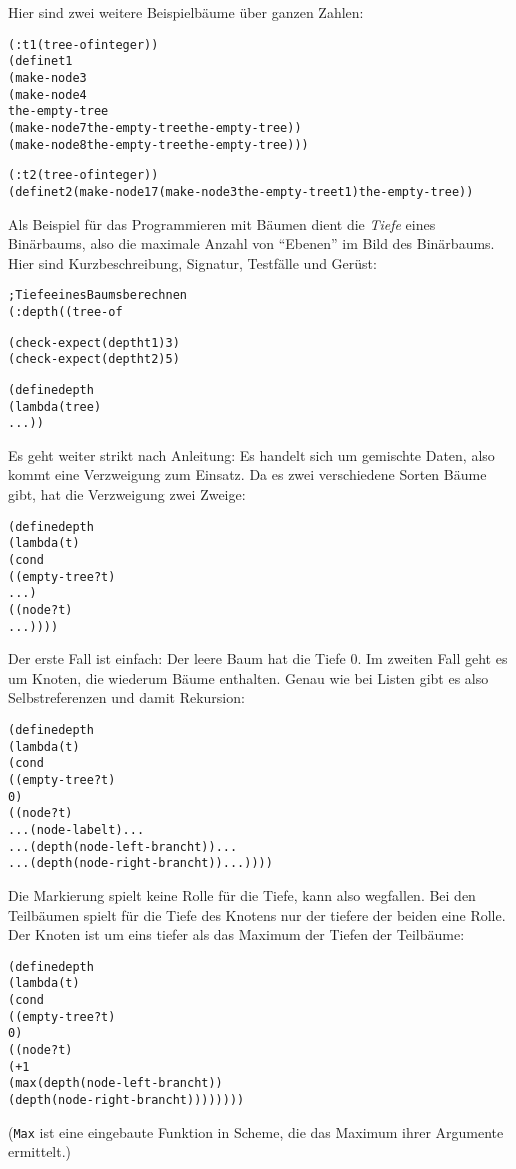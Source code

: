 %
Hier sind zwei weitere Beispielbäume über ganzen Zahlen:
\begin{alltt}
(: t1 (tree-of integer))
(define t1
  (make-node 3
    (make-node 4
      the-empty-tree
      (make-node 7 the-empty-tree the-empty-tree))
    (make-node 8 the-empty-tree the-empty-tree)))

(: t2 (tree-of integer))
(define t2 (make-node 17 (make-node 3 the-empty-tree t1) the-empty-tree))
\end{alltt}
Als Beispiel für das Programmieren mit Bäumen dient die
\textit{Tiefe}
eines Binärbaums, also die maximale Anzahl von "`Ebenen"' im Bild des
Binärbaums.  Hier sind Kurzbeschreibung, Signatur, Testfälle und
Gerüst:
%
\begin{alltt}
; Tiefe eines Baums berechnen
(: depth ((tree-of %a) -> natural))

(check-expect (depth t1) 3)
(check-expect (depth t2) 5)

(define depth
  (lambda (tree)
    ...))
\end{alltt}
%
Es geht weiter strikt nach Anleitung: Es handelt sich um gemischte
Daten, also kommt eine Verzweigung zum Einsatz.  Da es zwei
verschiedene Sorten Bäume gibt, hat die Verzweigung zwei Zweige:
%
\begin{alltt}
(define depth
  (lambda (t)
    (cond
      ((empty-tree? t)
       ...)
      ((node? t)
       ...))))
\end{alltt}
%
Der erste Fall ist einfach: Der leere Baum hat die Tiefe 0.  Im
zweiten Fall geht es um Knoten, die wiederum Bäume enthalten.  Genau
wie bei Listen gibt es also Selbstreferenzen und damit Rekursion:
%
\begin{alltt}
(define depth
  (lambda (t)
    (cond
      ((empty-tree? t)
       0)
      ((node? t)
       ... (node-label t) ...
       ... (depth (node-left-branch t)) ...
       ... (depth (node-right-branch t)) ...))))
\end{alltt}
%
Die Markierung spielt keine Rolle für die Tiefe, kann also wegfallen.
Bei den Teilbäumen spielt für die Tiefe des Knotens nur der tiefere
der beiden eine Rolle.  Der Knoten ist um eins tiefer als das Maximum
der Tiefen der Teilbäume:
%
\begin{alltt}
(define depth
  (lambda (t)
    (cond
      ((empty-tree? t)
       0)
      ((node? t)
       (+ 1
          (max (depth (node-left-branch t))
               (depth (node-right-branch t))))))))
\end{alltt}
%
(\texttt{Max} ist eine eingebaute Funktion in
Scheme, die das Maximum ihrer Argumente ermittelt.)

